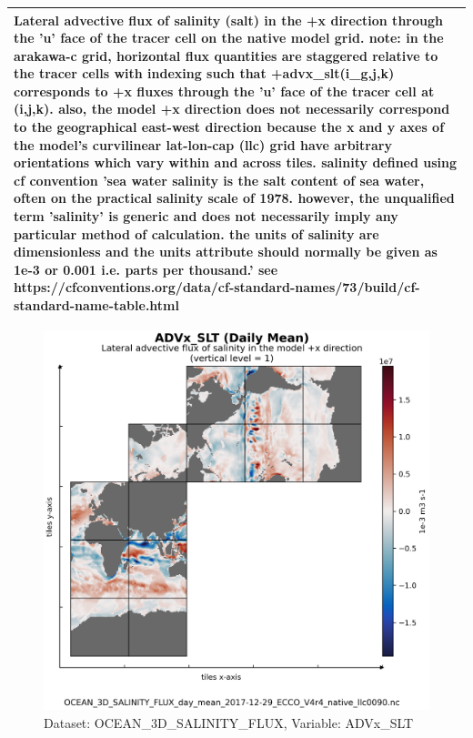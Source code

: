 \begin{longtable}{|m{}|m{}|m{}|m{}|}
\multicolumn{4}{|p{1\textwidth}|}{\footnotesize{{Lateral advective flux of salinity (salt) in the +x direction through the 'u' face of the tracer cell on the native model grid. note: in the arakawa-c grid, horizontal flux quantities are staggered relative to the tracer cells with indexing such that +advx\_slt(i\_g,j,k) corresponds to +x fluxes through the 'u' face of the tracer cell at (i,j,k). also, the model +x direction does not necessarily correspond to the geographical east-west direction because the x and y axes of the model's curvilinear lat-lon-cap (llc) grid have arbitrary orientations which vary within and across tiles. salinity defined using cf convention 'sea water salinity is the salt content of sea water, often on the practical salinity scale of 1978. however, the unqualified term 'salinity' is generic and does not necessarily imply any particular method of calculation. the units of salinity are dimensionless and the units attribute should normally be given as 1e-3 or 0.001 i.e. parts per thousand.' see https://cfconventions.org/data/cf-standard-names/73/build/cf-standard-name-table.html}}} \\ \hline
\end{longtable}

\begin{figure}[H]
\centering
\includegraphics[scale=0.55]{../images/plots/v4r4/native_plots/Ocean_Three-Dimensional_Salinity_Fluxes/ADVx_SLT.png}
\caption{Dataset: OCEAN\_3D\_SALINITY\_FLUX, Variable: ADVx\_SLT}
\label{tab:table-OCEAN_3D_SALINITY_FLUX_ADVx_SLT-Plot}
\end{figure}
\newpage
\pagebreak
